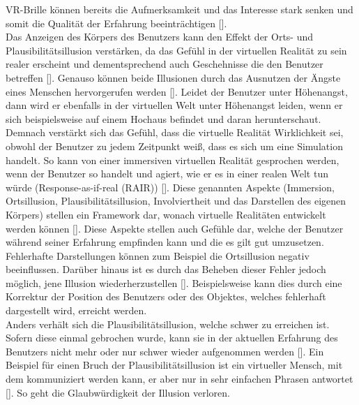 \documentclass[a4paper,12pt,oneside]{article}
\begin{document}
        VR-Brille können bereits die Aufmerksamkeit und 
        das Interesse stark senken und somit die Qualität
        der Erfahrung beeinträchtigen [\cite[227]{Witmer1998}]. \\
        Das Anzeigen des Körpers des Benutzers
        kann den Effekt der Orts- und Plausibilitätsillusion verstärken, da das
        Gefühl in der virtuellen Realität zu sein realer erscheint und 
        dementsprechend auch Geschehnisse die den
        Benutzer betreffen [\cite{Slater2009}]. Genauso können beide Illusionen durch das
        Ausnutzen der Ängste eines Menschen hervorgerufen werden [\cite{Slater2009}].
        Leidet der Benutzer unter Höhenangst, dann wird er ebenfalls in der virtuellen
        Welt unter Höhenangst leiden, wenn er sich beispielsweise auf einem Hochaus 
        befindet und daran herunterschaut. 
        Demnach verstärkt sich das Gefühl, dass die virtuelle Realität Wirklichkeit sei,
        obwohl der Benutzer zu jedem Zeitpunkt weiß, dass es sich um eine Simulation handelt.
        So kann von einer immersiven
        virtuellen Realität gesprochen werden, wenn der Benutzer so handelt und agiert, wie er es
        in einer realen Welt tun würde (\glqq Response-as-if-real\grqq{} (RAIR)) 
        [\cite{Slater2009}]. Diese genannten Aspekte (Immersion, Ortsillusion, 
        Plausibilitätsillusion, Involviertheit und das Darstellen des eigenen Körpers) 
        stellen ein Framework dar, wonach virtuelle Realitäten entwickelt werden können 
        [\cite{Slater2009}]. Diese Aspekte stellen auch Gefühle dar, welche der Benutzer
        während seiner Erfahrung empfinden kann und die es gilt gut umzusetzen.
        Fehlerhafte Darstellungen können zum Beispiel die Ortsillusion negativ beeinflussen.
        Darüber hinaus ist es durch das Beheben dieser Fehler jedoch möglich, jene Illusion
        wiederherzustellen [\cite{Slater2009}]. Beispielsweise kann dies durch eine Korrektur
        der Position des Benutzers oder des Objektes, welches fehlerhaft dargestellt wird,
        erreicht werden. \\
        Anders verhält sich die Plausibilitätsillusion, welche schwer
        zu erreichen ist. Sofern diese einmal gebrochen wurde, kann sie in der aktuellen 
        Erfahrung des Benutzers nicht mehr oder nur schwer wieder aufgenommen werden 
        [\cite{Slater2009}].
        Ein Beispiel für einen Bruch der Plausibilitätsillusion ist ein virtueller Mensch,
        mit dem kommuniziert werden kann, er aber nur in sehr einfachen Phrasen antwortet
        [\cite[19]{Dorner2013}]. So geht die Glaubwürdigkeit der Illusion verloren. 
\end{document}
